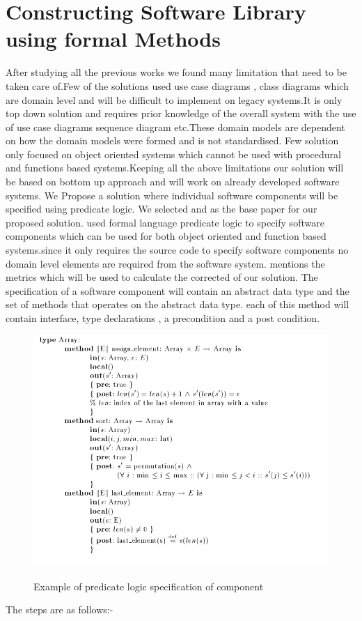 \documentclass[12pt]{article}
\begin{document}
\section{Constructing Software Library using formal Methods}
After studying all the previous works we found many limitation that need to be taken care of.Few of the solutions used use case diagrams , class diagrams which are domain level and will be difficult to implement on legacy systems.It is only top down solution and requires prior knowledge of the overall system with the use of use case diagrams sequence diagram etc.These domain models are dependent on how the domain models were formed and is not standardised. Few solution only focused on object oriented systems which cannot be used with procedural and functions based systems.Keeping all the above limitations our solution will be based on bottom up approach and will work on already developed software systems.
We Propose a solution where individual software components will be specified using predicate logic\cite{formalFromCode}.
We selected \cite{formal} and \cite{survey} as the base paper for our proposed solution.\cite{formal} used formal language predicate logic to specify software components which can be used for both object oriented and function based systems.since it only requires the source code to specify software components no domain level elements are required from the software system.\cite{survey} mentions the metrics which will be used to calculate the corrected of our solution.
The specification of a software component will contain an abstract data type and the set of methods that operates on the abstract data type.
each of this method will contain interface, type declarations , a precondition and a post condition.
\begin{figure}
	\includegraphics[scale=0.5]{example_formal.png}
	\caption{Example of predicate logic specification of component}
	\cite{formal}
\end{figure}
The steps are as follows:-
\end{document}
